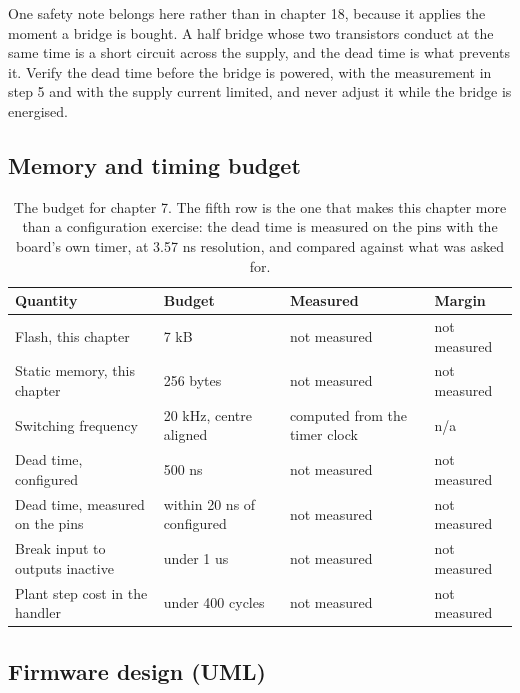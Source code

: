 One safety note belongs here rather than in chapter 18, because it applies the
moment a bridge is bought. A half bridge whose two transistors conduct at the
same time is a short circuit across the supply, and the dead time is what
prevents it. Verify the dead time before the bridge is powered, with the
measurement in step 5 and with the supply current limited, and never adjust it
while the bridge is energised.

\subsection*{Memory and timing budget}

\begin{table}[H]\centering\small
\begin{tabular}{p{44mm}p{28mm}p{28mm}p{30mm}}
\toprule
Quantity & Budget & Measured & Margin \\
\midrule
Flash, this chapter & 7 kB & not measured & not measured \\
Static memory, this chapter & 256 bytes & not measured & not measured \\
Switching frequency & 20 kHz, centre aligned & computed from the timer clock & n/a \\
Dead time, configured & 500 ns & not measured & not measured \\
Dead time, measured on the pins & within 20 ns of configured & not measured & not measured \\
Break input to outputs inactive & under 1 us & not measured & not measured \\
Plant step cost in the handler & under 400 cycles & not measured & not measured \\
\bottomrule
\end{tabular}
\caption{The budget for chapter 7. The fifth row is the one that makes this chapter more than a configuration exercise: the dead time is measured on the pins with the board's own timer, at 3.57 ns resolution, and compared against what was asked for.}
\end{table}

\subsection*{Firmware design (UML)}


